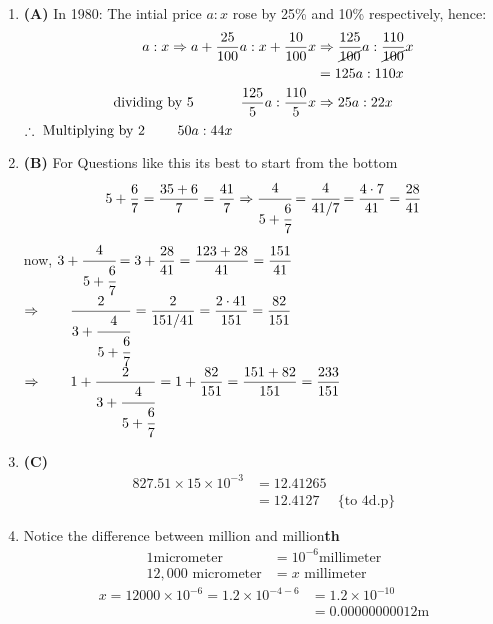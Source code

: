 \begin{multicols}{2}
\begin{enumerate}[label={\arabic*.}]
    \item \textbf{(A)} In 1980: The intial price \(a : x\) rose by 25\% and 10\% respectively, hence: 
        \begin{align*}
        a:x \Rightarrow  a + \dfrac{25}{100}a : x + \dfrac{10}{100}x &\Rightarrow \dfrac{125}{\cancel{100}}a : \dfrac{110}{\cancel{100}}x \\ 
        &= {125}a : 110x \\
        \text{dividing by 5 } \hspace{30px} \dfrac{125}{5} a : \dfrac{110}{5} x  &\Rightarrow 25a : 22x 
    \end{align*}
    \(\therefore \text{ Multiplying by 2 } \hspace{20px}  50a : 44x \)

    \item \textbf{(B)} For Questions like this its best to start from the bottom \\
    \[5 + \dfrac{6}{7} = \dfrac{35 + 6}{7} = \dfrac{41}{7} \Rightarrow \cfrac{4}{5 + \cfrac{6}{7}} = \cfrac{4}{41/7} = \dfrac{4 \cdot 7}{41} = \dfrac{28}{41}\]
    now, \(3 + \cfrac{4}{5 + \cfrac{6}{7}} = 3 + \dfrac{28}{41} = \dfrac{123 + 28}{41} = \dfrac{151}{41} \)  \vspace{10pt} \\
    \(\Rightarrow \hspace{20px} \dfrac{2}{3 + \cfrac{4}{5 + \cfrac{6}{7}}} = \dfrac{2}{151/41} = \dfrac{2 \cdot 41}{151} = \dfrac{82}{151} \) \vspace{10pt} \\
    \(\Rightarrow \hspace{20px} 1 + \dfrac{2}{3 + \cfrac{4}{5 + \cfrac{6}{7}}} = 1 + \dfrac{82}{151} = \dfrac{151 + 82}{151} = \dfrac{233}{151} \)
    
    \item \textbf{(C)}\begin{align*}
        827.51 \times 15 \times 10^{-3} &= 12.41265 \\
        &= 12.4127  &\text{\{ to 4d.p\}}
        \end{align*}
    \item Notice the difference between million and million\textbf{th} 
    \begin{align*}
     1 \text{micrometer} &= 10^{-6}\text{millimeter} \\
    12,000 \text{ micrometer} &= x \text{ millimeter} 
    \end{align*}
    \begin{align*}
    x = 12000 \times 10^{-6}  = 1.2 \times 10^{-4 -6 } &= 1.2 \times 10^{-10} \\ &= 0.00000000012 \text{m}
    \end{align*}


\end{enumerate}
\end{multicols}
